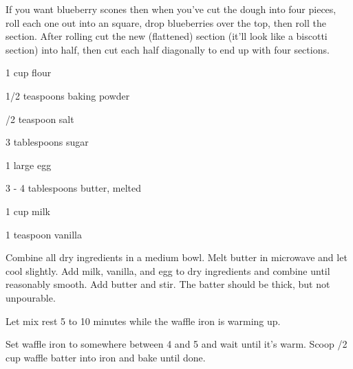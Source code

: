\begin{Tip}
      {
            If you want blueberry scones then when you've cut the dough into four pieces, roll each
            one out into an  square, drop blueberries over the top, then roll the
            section. After rolling cut the new (flattened) section (it'll look like a biscotti section)
            into half, then cut each half diagonally to end up with four sections.
      }
\end{Tip}

%
%
%
%
\newpage



\begin{IngredientsAndSteps}
      \ListIngredientsAndSteps
      {
            1 cup flour

            1/2 teaspoons baking powder

            /2 teaspoon salt

            3 tablespoons sugar

            1 large egg

            3 - 4 tablespoons butter, melted

            1 cup milk

            1 teaspoon vanilla
      }
      {
            Combine all dry ingredients in a medium bowl. Melt butter in
            microwave and let cool slightly. Add milk, vanilla, and egg to
            dry ingredients and combine until reasonably smooth. Add butter and stir.
            The batter should be thick, but not unpourable.

            Let mix rest 5 to 10 minutes while the waffle iron is warming up.

            Set waffle iron to somewhere between 4 and 5 and wait until it's warm.
            Scoop /2 cup waffle batter into iron and bake until done.
      }
\end{IngredientsAndSteps}

